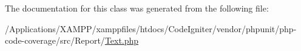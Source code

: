 The documentation for this class was generated from the following file\+:\begin{DoxyCompactItemize}
\item 
/\+Applications/\+X\+A\+M\+P\+P/xamppfiles/htdocs/\+Code\+Igniter/vendor/phpunit/php-\/code-\/coverage/src/\+Report/\mbox{\hyperlink{php-code-coverage_2src_2_report_2_text_8php}{Text.\+php}}\end{DoxyCompactItemize}
